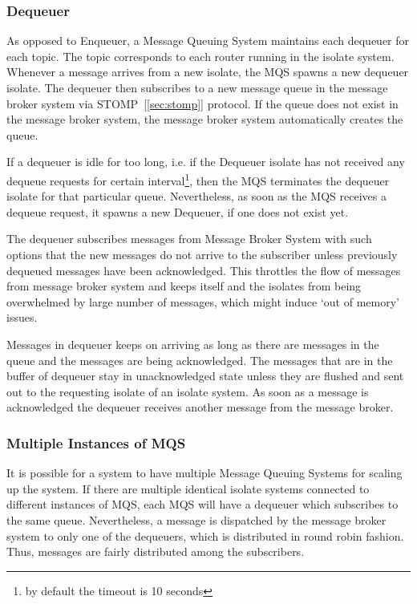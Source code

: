   \subsubsection{Dequeuer}
  As opposed to Enqueuer, a Message Queuing System maintains each dequeuer for each topic. The topic corresponds to each router running in the isolate system. Whenever a message arrives from a new isolate, the MQS spawns a new dequeuer isolate. The dequeuer then subscribes to a new message queue in the message broker system via STOMP~[\ref{sec:stomp}] protocol. If the queue does not exist in the message broker system, the message broker system automatically creates the queue.

  If a dequeuer is idle for too long, i.e. if the Dequeuer isolate has not received any dequeue requests for certain interval\footnote{by default the timeout is 10 seconds}, then the MQS terminates the dequeuer isolate for that particular queue. Nevertheless, as soon as the MQS receives a dequeue request, it spawns a new Dequeuer, if one does not exist yet.

  The dequeuer subscribes messages from Message Broker System with such options that the new messages do not arrive to the subscriber unless previously dequeued messages have been acknowledged. This throttles the flow of messages from message broker system and keeps itself and the isolates from being overwhelmed by large number of messages, which might induce ‘out of memory’ issues.

  Messages in dequeuer keeps on arriving as long as there are messages in the queue and the messages are being acknowledged. The messages that are in the buffer of dequeuer stay in unacknowledged state unless they are flushed and sent out to the requesting isolate of an isolate system. As soon as a message is acknowledged the dequeuer receives another message from the message broker.

  \subsubsection{Multiple Instances of MQS}
  It is possible for a system to have multiple Message Queuing Systems for scaling up the system. If there are multiple identical isolate systems connected to different instances of MQS, each MQS will have a dequeuer which subscribes to the same queue. Nevertheless, a message is dispatched by the message broker system to only one of the dequeuers, which is distributed in round robin fashion. Thus, messages are fairly distributed among the subscribers.

